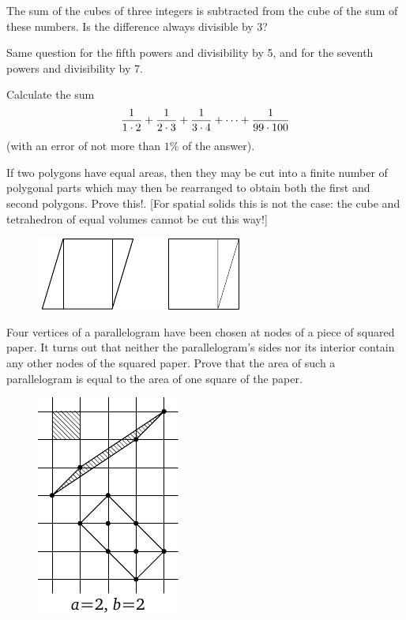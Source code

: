 \documentclass[12pt]{article}  %
\begin{document}
 The sum of the cubes of three integers is subtracted from the cube of the sum of these numbers. Is the difference always divisible by 3?

\bigskip
{} Same question for the fifth powers and divisibility by 5, and for the seventh powers and divisibility by 7.

\bigskip
{} Calculate the sum
$${1 \over 1\cdot 2} +  {1 \over 2\cdot 3} + {1 \over 3\cdot 4} + \dots + {1 \over 99\cdot 100}$$
(with an error of not more than $1\%$ of the answer).

\bigskip
{} If two polygons have equal areas, then they may be cut into a finite number of polygonal parts which may then be rearranged to obtain both the first and second polygons. Prove this!. [For spatial solids this is not the case: the cube and tetrahedron of equal volumes cannot be cut this way!]
\begin{figure}[h]
\centering
\includegraphics{q39_horizontal}\\[6pt]
\end{figure}

 Four vertices of a parallelogram have been chosen at nodes of a piece of squared paper. It turns out that neither the parallelogram's sides nor its interior contain any other nodes of the squared paper. Prove that the area of such a parallelogram is equal to the area of one square of the paper. 
\begin{figure}[h]
 \centering
\includegraphics{taskbook-24}\vskip3pt
\end{figure}
\end{document}
